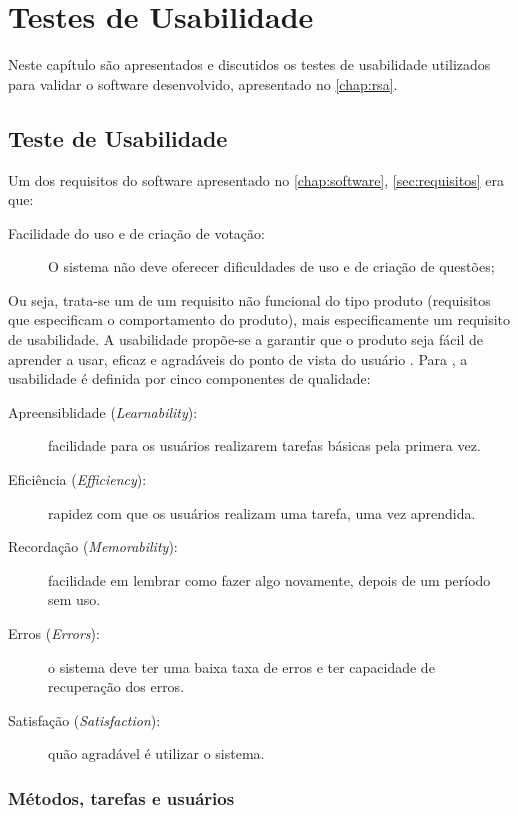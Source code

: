 \chapter{Testes de Usabilidade}

Neste capítulo são apresentados e discutidos os testes de usabilidade
utilizados para validar o software desenvolvido, apresentado no \autoref{chap:rsa}.

\section{Teste de Usabilidade}

Um dos requisitos do software apresentado no \autoref{chap:software}, \autoref{sec:requisitos} era que:
\begin{description}
\item[Facilidade do uso e de criação de votação:] O sistema não deve oferecer
dificuldades de uso e de criação de questões;
\end{description}

Ou seja, trata-se um de um requisito não funcional do tipo produto (requisitos que
especificam o comportamento do produto), mais especificamente um requisito de usabilidade.
A usabilidade propõe-se a garantir que o produto seja fácil de aprender a usar, eficaz e
agradáveis do ponto de vista do usuário \cite{rogers2013design}.
Para , a usabilidade é definida por cinco componentes de qualidade:

\begin{description}
  \item[Apreensiblidade (\textit{Learnability}):] facilidade para os usuários realizarem tarefas básicas
  pela primera vez.
  \item[Eficiência (\textit{Efficiency}):] rapidez com que os usuários realizam uma tarefa, uma vez aprendida.
  \item[Recordação (\textit{Memorability}):] facilidade em lembrar como fazer algo novamente, depois de um período sem uso.
  \item[Erros (\textit{Errors}):] o sistema deve ter uma baixa taxa de erros e ter capacidade de
  recuperação dos erros.
  \item[Satisfação (\textit{Satisfaction}):] quão agradável é utilizar o sistema.
\end{description}

\subsection{Métodos, tarefas e usuários}

